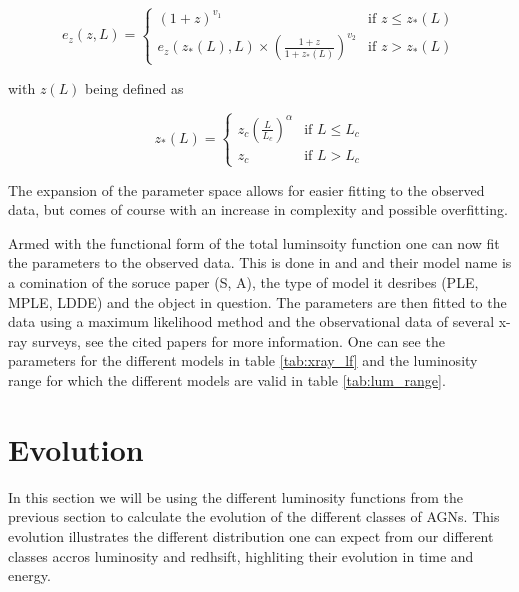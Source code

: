 \documentclass{article}
\begin{document}
 \begin{equation}
    e_z(z, L) = 
    \begin{cases} 
    (1 + z)^{v_1} & \text{if } z \leq z_*(L) \\
    e_z(z_*(L), L) \times \left( \frac{1 + z}{1 + z_*(L)} \right)^{v_2} & \text{if } z >  z_*(L)
    \end{cases}
 \end{equation}

 with $z(L)$ being defined as

 \begin{equation}
    z_*(L) = 
    \begin{cases} 
    z_c \left( \frac{L}{L_c} \right)^\alpha & \text{if } L \leq L_c \\
    z_c & \text{if } L > L_c 
    \end{cases}
 \end{equation}


 The expansion of the parameter space allows for easier fitting to the observed data, but comes of course with an increase in complexity and possible overfitting. 


Armed with the functional form of the total luminsoity function one can now fit the parameters to the observed data. This is done in \cite{Silverman_2008} and \cite{Ajello_2009} and their 
model name is a comination of the soruce paper (S, A), the type of model it desribes (PLE, MPLE, LDDE) and the object in question. The parameters are then fitted to the data using a maximum likelihood method and the observational data of several x-ray surveys, see the cited papers for more information.
One can see the parameters for the different models in table \ref{tab:xray_lf} and the luminosity range for which the different models are valid in table \ref{tab:lum_range}.





\section{Evolution}
In this section we will be using the different luminosity functions from the previous section to calculate the evolution of the different classes of AGNs. 
This evolution illustrates the different distribution one can expect from our different classes accros luminosity and redhsift, highliting their evolution in time and energy.
\end{document}
